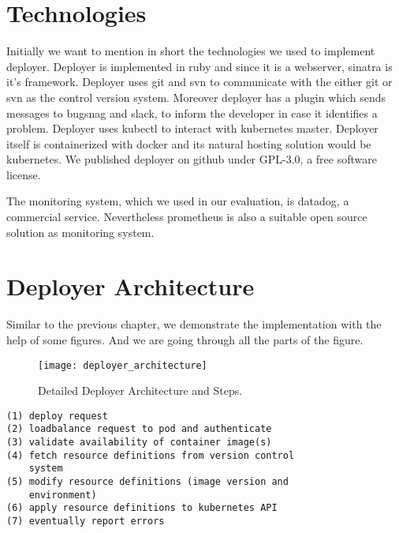 \section{Technologies}

Initially we want to mention in short the technologies we used to implement
deployer. Deployer is implemented in ruby and since it is a webserver, sinatra is it's
framework. Deployer uses git and svn to communicate with the either git or svn as the
control version system. Moreover deployer has a plugin which sends messages to bugsnag and
slack, to inform the developer in case it identifies a problem. Deployer uses kubectl to
interact with kubernetes master. Deployer itself is containerized with docker and its
natural hosting solution would be kubernetes. We published deployer on github under
GPL-3.0, a free software license.

The monitoring system, which we used in our evaluation, is datadog, a commercial
service. Nevertheless prometheus is also a suitable open source solution as monitoring
system.

\section{Deployer Architecture}

Similar to the previous chapter, we demonstrate the implementation with the help of some
figures. And we are going through all the parts of the figure.

\begin{figure}[htbp]
  \centering
  \texttt{[image: deployer\_architecture]}
  \caption[nprtflow]{Detailed Deployer Architecture and Steps.}
  \label{fig:deployer_architecture}
\end{figure}

\begin{verbatim}
(1) deploy request
(2) loadbalance request to pod and authenticate
(3) validate availability of container image(s)
(4) fetch resource definitions from version control
    system
(5) modify resource definitions (image version and
    environment)
(6) apply resource definitions to kubernetes API
(7) eventually report errors
\end{verbatim}

